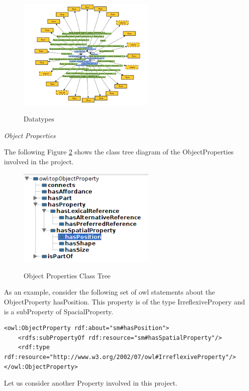 \begin{figure}[H]
\centering
\includegraphics[width=0.6\textwidth]{imgs/Datatype.png}
\label{fig:datatypes}
\caption{Datatypes}
\end{figure}

\textit{Object Properties}

The following Figure \ref{fig:propClassTree} shows the class tree diagram of the ObjectProperties involved in the project.
\begin{figure}[H]
\centering
\includegraphics[width=0.6\textwidth]{imgs/propClassTree.png}
\label{fig:propClassTree}
\caption{Object Properties Class Tree}
\end{figure}

As an example, consider the following set of owl statements about the ObjectProperty hasPosition. This property is of the type IrreflexivePropery and is a subProperty of SpacialProperty.

\begin{lstlisting}
<owl:ObjectProperty rdf:about="sm#hasPosition">
    <rdfs:subPropertyOf rdf:resource="sm#hasSpatialProperty"/>
    <rdf:type rdf:resource="http://www.w3.org/2002/07/owl#IrreflexiveProperty"/>
</owl:ObjectProperty>
\end{lstlisting}    

Let us consider another Property involved in this project.

